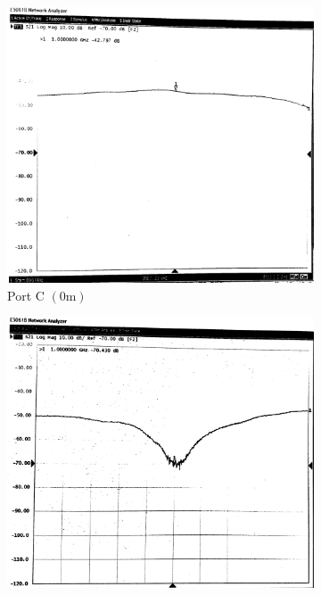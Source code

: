 \documentclass[10pt]{article}
\begin{document}
\begin{figure}[ht]
    \centering
    \begin{subfigure}[b]{0.45\textwidth}
        \includegraphics[width=\textwidth]{../photos/lab2/short-cir-peak.jpg}
        \caption{Port C $(0\text{m})$}
    \end{subfigure}
    \quad
    \begin{subfigure}[b]{0.45\textwidth}
        \includegraphics[width=\textwidth]{../photos/lab2/short-cir-valley.jpg}

\end{subfigure}
\end{figure}
\end{document}

